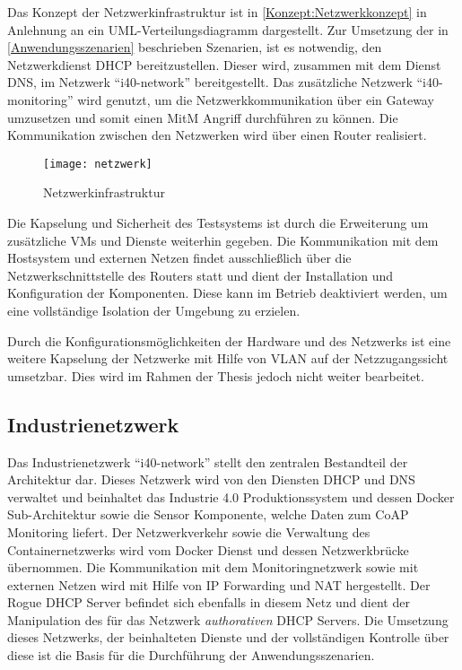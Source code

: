 Das Konzept der Netzwerkinfrastruktur ist in \autoref{Konzept:Netzwerkkonzept} in Anlehnung an ein \ac{UML}-Verteilungsdiagramm dargestellt. Zur Umsetzung der in \autoref{Anwendungsszenarien} beschrieben Szenarien, ist es notwendig, den Netzwerkdienst \ac{DHCP} bereitzustellen. Dieser wird, zusammen mit dem Dienst \ac{DNS}, im Netzwerk "`i40-network"' bereitgestellt. Das zusätzliche Netzwerk "`i40-monitoring"' wird genutzt, um die Netzwerkkommunikation über ein Gateway umzusetzen und somit einen \ac{MitM} Angriff durchführen zu können. Die Kommunikation zwischen den Netzwerken wird über einen Router realisiert.

\begin{figure}[h]
  \centering
  \texttt{[image: netzwerk]}
  \caption{Netzwerkinfrastruktur} 
  \label{Konzept:Netzwerkkonzept}
\end{figure}

Die Kapselung und Sicherheit des Testsystems ist durch die Erweiterung um zusätzliche \ac{VM}s und Dienste weiterhin gegeben. Die Kommunikation mit dem Hostsystem und externen Netzen findet ausschließlich über die Netzwerkschnittstelle des Routers statt und dient der Installation und Konfiguration der Komponenten. Diese kann im Betrieb deaktiviert werden, um eine vollständige Isolation der Umgebung zu erzielen.

Durch die Konfigurationsmöglichkeiten der Hardware und des Netzwerks ist eine weitere Kapselung der Netzwerke mit Hilfe von \ac{VLAN} auf der Netzzugangssicht umsetzbar. Dies wird im Rahmen der Thesis jedoch nicht weiter bearbeitet.

\subsection{Industrienetzwerk}
Das Industrienetzwerk "`i40-network"' stellt den zentralen Bestandteil der Architektur dar. Dieses Netzwerk wird von den Diensten \ac{DHCP} und \ac{DNS} verwaltet und beinhaltet das Industrie 4.0 Produktionssystem und dessen Docker Sub-Architektur sowie die Sensor Komponente, welche Daten zum \ac{CoAP} Monitoring liefert. Der Netzwerkverkehr sowie die Verwaltung des Containernetzwerks wird vom Docker Dienst und dessen Netzwerkbrücke übernommen. Die Kommunikation mit dem Monitoringnetzwerk sowie mit externen Netzen wird mit Hilfe von \ac{IP} Forwarding und \ac{NAT} hergestellt. Der Rogue \ac{DHCP} Server befindet sich ebenfalls in diesem Netz und dient der Manipulation des für das Netzwerk \textit{authorativen} \ac{DHCP} Servers. Die Umsetzung dieses Netzwerks, der beinhalteten Dienste und der vollständigen Kontrolle über diese ist die Basis für die Durchführung der Anwendungsszenarien.

